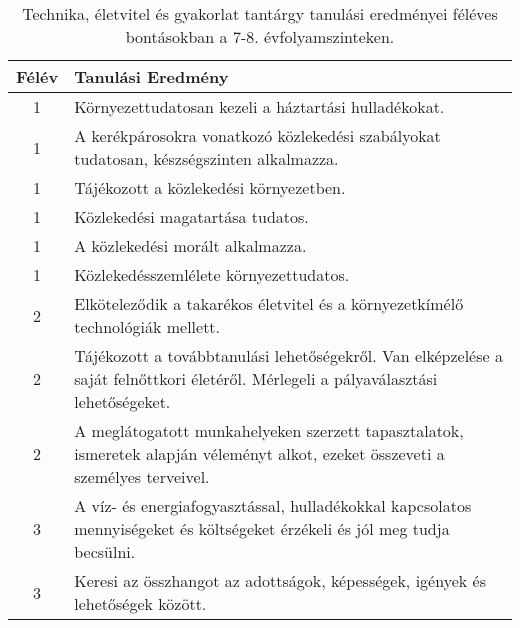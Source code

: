 \begin{longtable}{c | p{12cm} }
                        \end{longtable}
            \clearpage

       
           \begin{longtable}{c | p{12cm} }
            \caption[Technika, életvitel és gyakorlat 7-8.]{Technika, életvitel és gyakorlat tantárgy tanulási eredményei féléves bontásokban a 7-8. évfolyamszinteken. }  \\

            \textbf{Félév} & \textbf{Tanulási Eredmény} \\
            \hline
            \endhead
                                
                                          1 &  Környezettudatosan kezeli a háztartási hulladékokat. \\ \hline
                                          1 &  A kerékpárosokra vonatkozó közlekedési szabályokat tudatosan, készségszinten alkalmazza. \\ \hline
                                          1 &  Tájékozott a közlekedési környezetben. \\ \hline
                                          1 &  Közlekedési magatartása tudatos. \\ \hline
                                          1 &  A közlekedési morált alkalmazza. \\ \hline
                                          1 &  Közlekedésszemlélete környezettudatos. \\ \hline
                                      
                                
                                          2 &  Elköteleződik a takarékos életvitel és a környezetkímélő technológiák mellett. \\ \hline
                                          2 &  Tájékozott a továbbtanulási lehetőségekről. Van elképzelése a saját felnőttkori életéről. Mérlegeli a pályaválasztási lehetőségeket. \\ \hline
                                          2 &  A meglátogatott munkahelyeken szerzett tapasztalatok, ismeretek alapján véleményt alkot, ezeket összeveti a személyes terveivel. \\ \hline
                                      
                                
                                          3 &  A víz- és energiafogyasztással, hulladékokkal kapcsolatos mennyiségeket és költségeket érzékeli és jól meg tudja becsülni. \\ \hline
                                          3 &  Keresi az összhangot az adottságok, képességek, igények és lehetőségek között. \\ \hline
                                      

\end{longtable}
